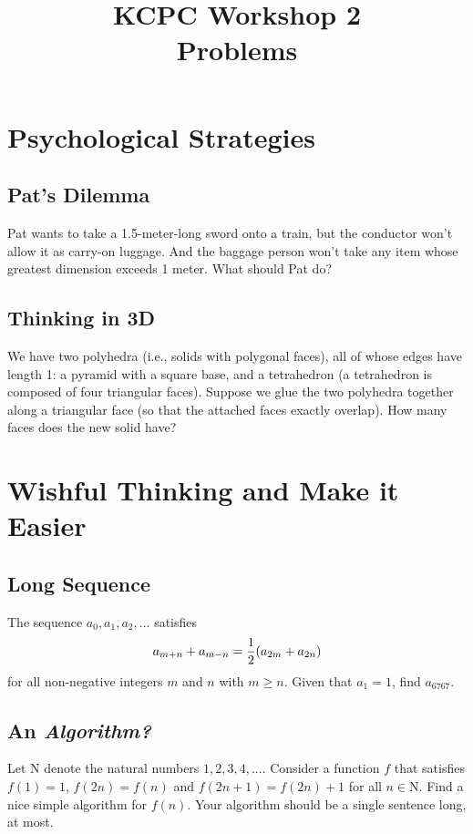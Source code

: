 \documentclass[12pt]{article}
\title{KCPC Workshop 2 \\ Problems}
\author{}
\date{}
\begin{document}
\maketitle

\section{Psychological Strategies}

\subsection{Pat's Dilemma}
Pat wants to take a 1.5-meter-long sword onto a train, but the conductor won't allow it as carry-on luggage. And the baggage person won't take any item whose greatest dimension exceeds 1 meter. What should Pat do?

\subsection{Thinking in 3D}
We have two polyhedra (i.e., solids with polygonal faces), all of whose edges have length 1: a pyramid with a square base, and a tetrahedron (a tetrahedron is composed of four triangular faces). Suppose we glue the two polyhedra together along a triangular face (so that the attached faces exactly overlap). How many faces does the new solid have?

\section{Wishful Thinking and Make it Easier}

\subsection{Long Sequence}

The sequence $a_0, a_1, a_2, \ldots$ satisfies
\begin{equation}
    a_{m+n}+a_{m-n} = \frac{1}{2}(a_{2m}+a_{2n}) \notag
\end{equation}
for all non-negative integers $m$ and $n$ with $m \geq n$. Given that $a_1 = 1$, find $a_{6767}$.

\subsection{An \textit{Algorithm?}}

Let $\mathrm{N}$ denote the natural numbers ${1, 2, 3, 4, ...}$. Consider a function $f$ that satisfies $f(1) = 1$, $f(2n) = f(n)$ and $f(2n+1) = 𝑓(2n)+1$ for all $n \in \mathrm{N}$. Find a nice simple algorithm for $f(n)$. Your algorithm should be a single sentence long, at most.
\end{document}
